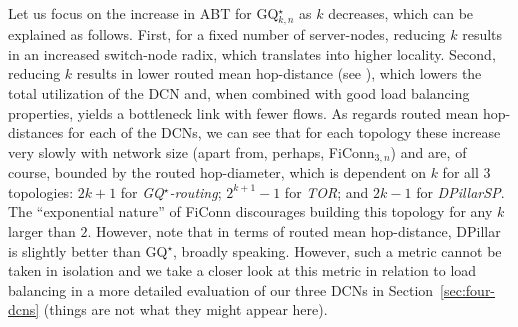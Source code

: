 \documentclass[]{amsart}
\newcommand{\tor}{\textit{TOR}}
\begin{document}
{Let us focus on the increase in ABT for GQ$^\star_{k,n}$ as $k$ decreases, which can be explained as follows. First, for a fixed number of server-nodes, reducing $k$ results
in an increased switch-node radix, which translates into higher locality.
Second, reducing $k$ results in lower routed mean hop-distance (see
), which lowers the total
utilization of the DCN and, when combined with good load balancing
properties, yields a bottleneck link with fewer flows. As regards routed mean hop-distances for each of the DCNs, we can see that for each topology
these
increase very slowly with network size (apart from, perhaps, FiConn$_{3,n}$) and are, of course, bounded by
the routed hop-diameter, which is dependent on $k$ for all $3$
topologies: $2k+1$ for \emph{GQ$^\star$-routing\/}; $2^{k+1}-1$ for \tor; and $2k-1$ for
\emph{DPillarSP\/}.
The ``exponential nature'' of FiConn discourages building this
topology for any $k$ larger than $2$. However, note that in terms of routed mean hop-distance, DPillar is slightly better than GQ$^\star$, broadly speaking. However, such a metric cannot be taken in isolation and we take a closer look at this metric in relation to load balancing in a more detailed evaluation of our three DCNs in Section~\ref{sec:four-dcns} (things are not what they might appear here).

\begin{figure}[ht]
{\centering


}
\end{figure}}
\end{document}
